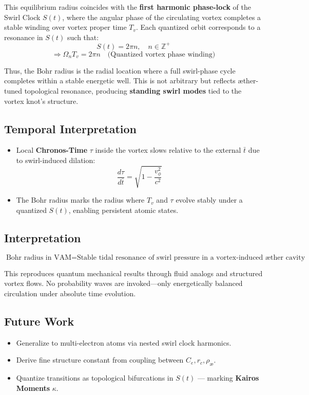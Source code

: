 This equilibrium radius coincides with the \textbf{first harmonic phase-lock} of the Swirl Clock $S(t)$, where the angular phase of the circulating vortex completes a stable winding over vortex proper time $T_v$. Each quantized orbit corresponds to a resonance in $S(t)$ such that:
\[
    S(t) = 2\pi n, \quad n \in \mathbb{Z}^+
\]
\[
    \Rightarrow \Omega_n T_v = 2\pi n \quad \text{(Quantized vortex phase winding)}
\]

Thus, the Bohr radius is the radial location where a full swirl-phase cycle completes within a stable energetic well. This is not arbitrary but reflects \ae ther-tuned topological resonance, producing \textbf{standing swirl modes} tied to the vortex knot's structure.

\subsection*{Temporal Interpretation}

\begin{itemize}
    \item Local \textbf{Chronos-Time} $\tau$ inside the vortex slows relative to the external $\bar{t}$ due to swirl-induced dilation:
    \[ \frac{d\tau}{d\bar{t}} = \sqrt{1 - \frac{v_\phi^2}{c^2}} \]
    \item The Bohr radius marks the radius where $T_v$ and $\tau$ evolve stably under a quantized $S(t)$, enabling persistent atomic states.
\end{itemize}

\subsection*{Interpretation}

\begin{equation}
    \boxed{
        \text{Bohr radius in VAM} =
        \text{Stable tidal resonance of swirl pressure in a vortex-induced \ae ther cavity}
    }
\end{equation}

This reproduces quantum mechanical results through fluid analogs and structured vortex flows. No probability waves are invoked---only energetically balanced circulation under absolute time evolution.

\subsection*{Future Work}

\begin{itemize}
    \item Generalize to multi-electron atoms via nested swirl clock harmonics.
    \item Derive fine structure constant from coupling between $C_e, r_c, \rho_\text{\ae}$.
    \item Quantize transitions as topological bifurcations in $S(t)$ --- marking \textbf{Kairos Moments} $\kappa$.
\end{itemize}
